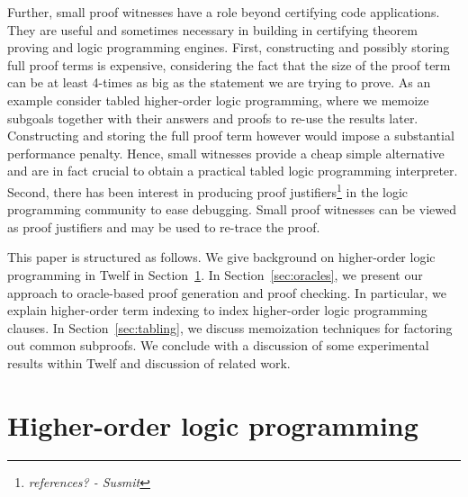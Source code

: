 \documentclass{acmconf}
\newcommand{\ednote}[1]{\footnote{\it #1}}
\begin{document}

Further, small proof witnesses have a role beyond certifying code
applications. They are useful and sometimes necessary in building in
certifying theorem proving and logic programming engines. First,
constructing and possibly storing full proof terms is expensive,
considering the fact that the size of the proof term can be at least
4-times as big as the statement we are trying to prove. As an example
consider tabled higher-order logic programming, where we memoize
subgoals together with their answers and proofs to re-use the results
later. Constructing and storing the full proof term however would
impose a substantial performance penalty. Hence, small witnesses
provide a cheap simple alternative and are in fact crucial to obtain a
practical tabled logic programming interpreter. Second, there has been
interest in producing proof justifiers\ednote{references? - Susmit} in
the logic programming community to ease debugging. Small proof
witnesses can be viewed as proof justifiers and may be used to
re-trace the proof.

This paper is structured as follows. We give background on
higher-order logic programming in Twelf in Section~\ref{sec:twelf}. In
Section~\ref{sec:oracles}, we present our approach to oracle-based
proof generation and proof checking. In particular, we explain
higher-order term indexing to index higher-order logic programming
clauses. In Section~\ref{sec:tabling}, we discuss memoization
techniques for factoring out common subproofs. We conclude with a
discussion of some experimental results within Twelf and discussion of
related work.

\section{Higher-order logic programming}\label{sec:twelf}

\end{document}
